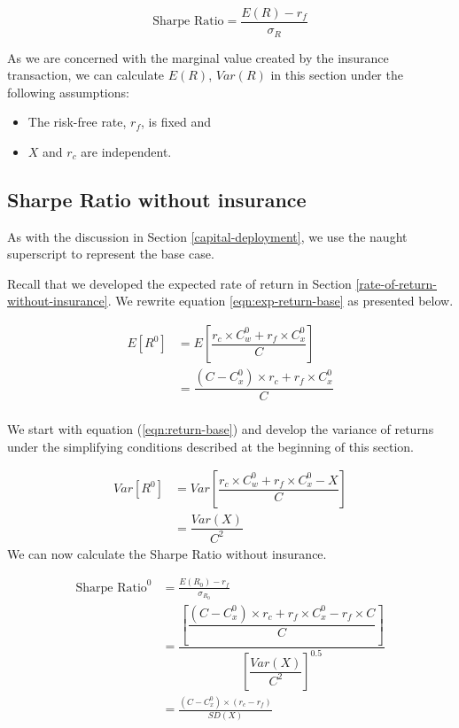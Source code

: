 \documentclass[
]{article}
\providecommand{\tightlist}{%
  \setlength{\itemsep}{0pt}\setlength{\parskip}{0pt}}
\begin{document}
\[
\text{Sharpe Ratio} = \frac{E(R)-r_f}{\sigma_{R}}
\]

As we are concerned with the marginal value created by the insurance
transaction, we can calculate \(E(R)\), \(Var(R)\) in this section under
the following assumptions:

\begin{itemize}
\tightlist
\item
  The risk-free rate, \(r_f\), is fixed and\\
\item
  \(X\) and \(r_c\) are independent.
\end{itemize}

\hypertarget{sharpe-ratio-without-insurance}{%
\subsection{Sharpe Ratio without
insurance}\label{sharpe-ratio-without-insurance}}

As with the discussion in Section \ref{capital-deployment}, we use the
naught superscript to represent the base case.

Recall that we developed the expected rate of return in Section
\ref{rate-of-return-without-insurance}. We rewrite equation
\ref{eqn:exp-return-base} as presented below.

\[
\begin{aligned}
E[R^{0}] &= E\left[\dfrac{r_c \times C_w^{0} + r_f \times C_{x}^{0}}{C}\right]\\
&=\dfrac{(C-C_{x}^{0})\times r_c + r_f \times C_{x}^{0}}{C}\\
\end{aligned}
\]

We start with equation (\ref{eqn:return-base}) and develop the variance
of returns under the simplifying conditions described at the beginning
of this section.

\[
\begin{aligned}
Var[R^{0}] &= Var\left[\dfrac{r_c \times C_w^{0} + r_f \times C_{x}^{0} - X}{C}\right]\\
&=\dfrac{Var(X)}{C^2}
\end{aligned}
\] We can now calculate the Sharpe Ratio without insurance.

\begin{align}
\nonumber \text{Sharpe Ratio}^0 &=\frac{E(R_0)-r_f}{\sigma_{R_0}}\\
\nonumber &=\dfrac{\left[\dfrac{(C-C_{x}^{0})\times r_c + r_f \times C_{x}^{0}-r_f \times C}{C}\right]}{\left[\dfrac{Var(X)}{C^2}\right]^{0.5}}\\
           &=\frac{(C-C_{x}^{0})\times (r_c-r_f)}{SD(X)} \label{eqn:sharpe-base}
\end{align}
\end{document}
